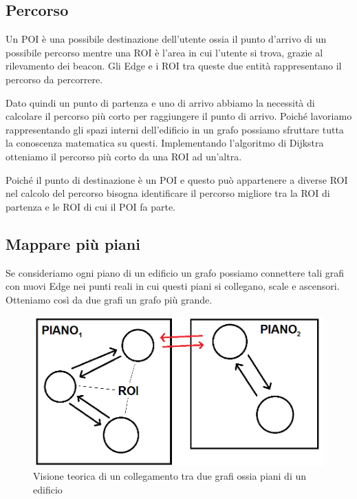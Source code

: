 \documentclass[../ManualeSviluppatore.tex]{subfiles}
\begin{document}
	\subsection{Percorso}
	Un POI è una possibile destinazione dell'utente ossia il punto d'arrivo di un possibile percorso mentre una ROI è l'area in cui l'utente si trova, grazie al rilevamento dei beacon. Gli Edge e i ROI tra queste due entità rappresentano il percorso da percorrere.
	
	Dato quindi un punto di partenza e uno di arrivo abbiamo la necessità di calcolare il percorso più corto per raggiungere il punto di arrivo. Poiché lavoriamo rappresentando gli spazi interni dell'edificio in un grafo possiamo sfruttare tutta la conoscenza matematica su questi.
	Implementando l'algoritmo di Dijkstra otteniamo il percorso più corto da una ROI ad un'altra.
	
	Poiché il punto di destinazione è un POI e questo può appartenere a diverse ROI nel calcolo del percorso bisogna identificare il percorso migliore tra la ROI di partenza e le ROI di cui il POI fa parte.

	
	
	\subsection{Mappare più piani}
	
		Se consideriamo ogni piano di un edificio un grafo possiamo connettere tali grafi con nuovi Edge nei punti reali in cui questi piani si collegano, scale e ascensori. Otteniamo così da due grafi un grafo più grande.
		
		\begin{figure} [h]
			\centering
			\includegraphics[scale=0.4]{img/GRAFI-CONNESSI}
			\caption{Visione teorica di un collegamento tra due grafi ossia piani di un edificio}
			\label{fig:GRAFI-CONNESSI}
	\end{figure}
\end{document}
